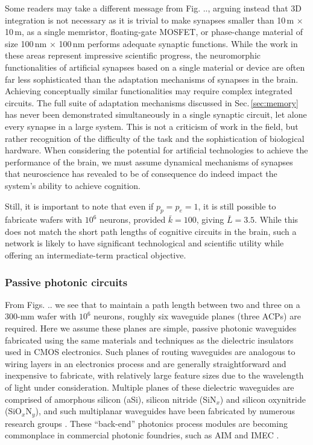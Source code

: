 \documentclass[twocolumn]{article}
\begin{document}
Some readers may take a different message from Fig. .., arguing instead that 3D integration is not necessary as it is trivial to make synapses smaller than 10\,\textmu m $\times$ 10\,\textmu m, as a single memristor, floating-gate MOSFET, or phase-change material of size 100\,nm $\times$ 100\,nm performs adequate synaptic functions. While the work in these areas represent impressive scientific progress, the neuromorphic functionalities of artificial synapses based on a single material or device are often far less sophisticated than the adaptation mechanisms of synapses in the brain.  Achieving conceptually similar functionalities may require complex integrated circuits. The full suite of adaptation mechanisms discussed in Sec.\,\ref{sec:memory} has never been demonstrated simultaneously in a single synaptic circuit, let alone every synapse in a large system. This is not a criticism of work in the field, but rather recognition of the difficulty of the task and the sophistication of biological hardware. When considering the potential for artificial technologies to achieve the performance of the brain, we must assume dynamical mechanisms of synapses that neuroscience has revealed to be of consequence do indeed impact the system's ability to achieve cognition.

Still, it is important to note that even if $p_p = p_e = 1$, it is still possible to fabricate wafers with $10^6$ neurons, provided $\bar{k} = 100$, giving $\bar{L} = 3.5$. While this does not match the short path lengths of cognitive circuits in the brain, such a network is likely to have significant technological and scientific utility while offering an intermediate-term practical objective.

\subsubsection{Passive photonic circuits}
From Figs. .. we see that to maintain a path length between two and three on a 300-mm wafer with $10^6$ neurons, roughly six waveguide planes (three ACPs) are required. Here we assume these planes are simple, passive photonic waveguides fabricated using the same materials and techniques as the dielectric insulators used in CMOS electronics. Such planes of routing waveguides are analogous to wiring layers in an electronics process and are generally straightforward and inexpensive to fabricate, with relatively large feature sizes due to the wavelength of light under consideration. Multiple planes of these dielectric waveguides are comprised of amorphous silicon (aSi), silicon nitride (SiN$_x$) and silicon oxynitride (SiO$_x$N$_y$), and such multiplanar waveguides have been fabricated by numerous research groups \cite{}. These ``back-end'' photonics process modules are becoming commonplace in commercial photonic foundries, such as AIM and IMEC \cite{}. 
\end{document}
